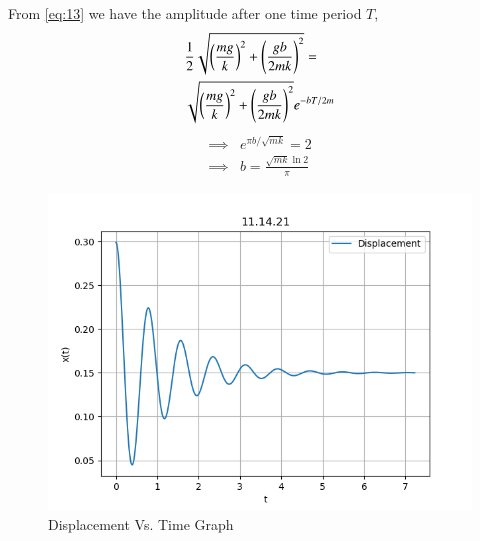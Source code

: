 \documentclass[journal,12pt,twocolumn]{IEEEtran}
\theoremstyle{remark}
\begin{document}
\begin{enumerate}
    From \eqref{eq:13} we have the amplitude after one time period $T$,
    \begin{align}
        \begin{split}
            &\frac{1}{2}\sqrt{\left(\frac{mg}{k}\right)^2+\left(\frac{gb}{2mk}\right)^2}= \\
            &\sqrt{\left(\frac{mg}{k}\right)^2+\left(\frac{gb}{2mk}\right)^2}e^{-bT/2m} \label{eq:14}
        \end{split}
    \end{align}
    \begin{align}
        \implies &e^{\pi b/\sqrt{mk}}=2 \label{eq:15}\\
        \implies &b=\frac{\sqrt{mk}\ln{2}}{\pi} \label{eq:16}
    \end{align}
    \begin{figure}[h]
        \centering
        \includegraphics[width=0.8\columnwidth]{11.14.21_plot.png}
        \caption{Displacement Vs. Time Graph}
        \label{fig:Fig-2}
    \end{figure}

\end{enumerate}
\end{document}
